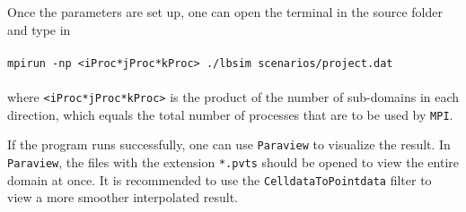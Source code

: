 \documentclass[11pt]{article}
\begin{document}
Once the parameters are set up, one can open the terminal in the source folder and type in\\ \\ \verb|mpirun -np <iProc*jProc*kProc> ./lbsim scenarios/project.dat| \\ \\ where \verb|<iProc*jProc*kProc>| is the product of the number of sub-domains in each direction, which equals the total number of processes that are to be used by \verb|MPI|.

If the program runs successfully, one can use \verb|Paraview| to visualize the result. In \verb|Paraview|, the files with the extension \verb|*.pvts| should be opened to view the entire domain at once. It is recommended to use the \verb|CelldataToPointdata| filter to view a more smoother interpolated result.
\end{document}
